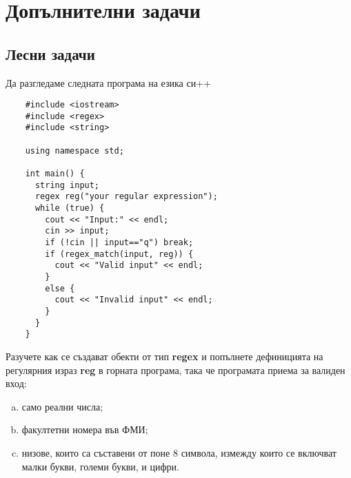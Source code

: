 \section{Допълнителни задачи}

\subsection{Лесни задачи}

\ifcode
\begin{problem}
  Да разгледаме следната програма на езика си++
  \begin{verbatim}
    #include <iostream>
    #include <regex>
    #include <string>
    
    using namespace std;
    
    int main() {
      string input;
      regex reg("your regular expression");
      while (true) {
        cout << "Input:" << endl;
        cin >> input;
        if (!cin || input=="q") break;
        if (regex_match(input, reg)) {
          cout << "Valid input" << endl;
        }  
        else {
          cout << "Invalid input" << endl;
        }
      }
    }
  \end{verbatim}
  Разучете как се създават обекти от тип {\bf regex} и попълнете дефиницията на регулярния израз {\bf reg} в горната програма, така че програмата приема за валиден вход:
  \begin{enumerate}[a)]
  \item 
    само реални числа;
  \item
    факултетни номера във ФМИ;
  \item
    низове, които са съставени от поне 8 символа, измежду които се включват малки букви, големи букви,
    и цифри.    
  \end{enumerate}
\end{problem}
\fi



